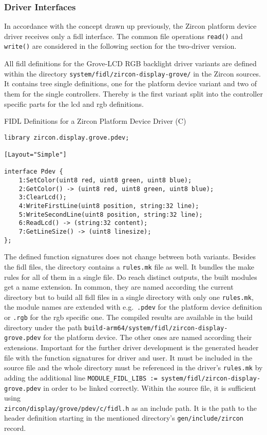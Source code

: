 \subsubsection{Driver Interfaces}
In accordance with the concept drawn up previously, the Zircon platform device driver receives only a \ac{fidl} interface.
The common file operations \texttt{read()} and \texttt{write()} are considered in the following section for the two-driver version.

All \ac{fidl} definitions for the Grove-LCD RGB backlight driver variants are defined within the directory \texttt{system/fidl/zircon-display-grove/} in the Zircon sources.
It contains tree single definitions, one for the platform device variant and two of them for the single controllers.
Thereby is the first variant split into the controller specific parts for the \ac{lcd} and \ac{rgb} definitions.
%
\begin{listing} [H]
    \caption{FIDL Definitions for a Zircon Platform Device Driver (C)}
\label{lst:fidldef}
\begin{verbatim}
library zircon.display.grove.pdev;

[Layout="Simple"]

interface Pdev {
    1:SetColor(uint8 red, uint8 green, uint8 blue);
    2:GetColor() -> (uint8 red, uint8 green, uint8 blue);
    3:ClearLcd();
    4:WriteFirstLine(uint8 position, string:32 line);
    5:WriteSecondLine(uint8 position, string:32 line);
    6:ReadLcd() -> (string:32 content);
    7:GetLineSize() -> (uint8 linesize);
};
\end{verbatim}
\end{listing}
%
The defined function signatures does not change between both variants.
Besides the \ac{fidl} files, the directory contains a \texttt{rules.mk} file as well.
It bundles the make rules for all of them in a single file.
Do reach distinct outputs, the built modules get a name extension.
In common, they are named according the current directory but to build all \ac{fidl} files in a single directory with only one \texttt{rules.mk}, the module names are extended with e.g.\ \texttt{.pdev} for the platform device definition or \texttt{.rgb} for the \ac{rgb} specific one. 
The compiled results are available in the build directory under the path \texttt{build-arm64/system/fidl/zircon-display-grove.pdev} for the platform device.
The other ones are named according their extensions.
Important for the further driver development is the generated header file with the function signatures for driver and user.
It must be included in the source file and the whole directory must be referenced in the driver's \texttt{rules.mk} by adding the additional line \texttt{MODULE_FIDL_LIBS := system/fidl/zircon-display-grove.pdev} in order to be linked correctly.
Within the source file, it is sufficient using \\ \texttt{zircon/display/grove/pdev/c/fidl.h} as an include path.
It is the path to the header definition starting in the mentioned directory's \texttt{gen/include/zircon} record.

